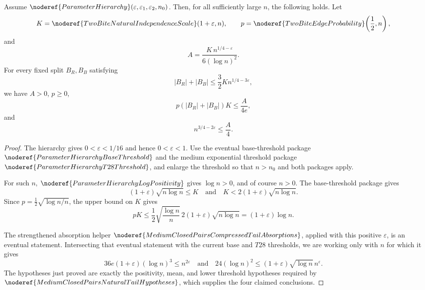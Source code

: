 \begin{lemma}
Assume \(\noderef{ParameterHierarchy}(\varepsilon,\varepsilon_1,\varepsilon_2,n_0)\).
Then, for all sufficiently large \(n\), the following holds.  Let
\[
K=\noderef{TwoBiteNaturalIndependenceScale}(1+\varepsilon,n),\qquad
p=\noderef{TwoBiteEdgeProbability}\!\left(\frac12,n\right),
\]
and
\[
A=\frac{K\,n^{1/4-\varepsilon}}{6(\log n)^2}.
\]
For every fixed split \(B_R,B_B\) satisfying
\[
|B_R|+|B_B|
\le \frac32 K n^{1/4-3\varepsilon},
\]
we have \(A>0\), \(p\ge0\),
\[
p(|B_R|+|B_B|)K\le\frac{A}{4e},
\]
and
\[
n^{3/4-2\varepsilon}\le \frac A4.
\]
\end{lemma}
\begin{proof}
The hierarchy gives \(0<\varepsilon<1/16\) and hence \(0<\varepsilon<1\).
Use the eventual base-threshold package
\(\noderef{ParameterHierarchyBaseThreshold}\) and the medium exponential
threshold package \(\noderef{ParameterHierarchyT28Threshold}\), and enlarge
the threshold so that \(n>n_0\) and both packages apply.

For such \(n\), \(\noderef{ParameterHierarchyLogPositivity}\) gives
\(\log n>0\), and of course \(n>0\).  The base-threshold package gives
\[
(1+\varepsilon)\sqrt{n\log n}\le K
\quad\text{and}\quad
K<2(1+\varepsilon)\sqrt{n\log n}.
\]
Since \(p=\frac12\sqrt{\log n/n}\), the upper bound on \(K\) gives
\[
pK\le
\frac12\sqrt{\frac{\log n}{n}}\,
2(1+\varepsilon)\sqrt{n\log n}
=(1+\varepsilon)\log n.
\]

The strengthened absorption helper
\(\noderef{MediumClosedPairsCompressedTailAbsorptions}\), applied with this
positive \(\varepsilon\), is an eventual statement.  Intersecting that
eventual statement with the current base and \(T28\) thresholds, we are
working only with \(n\) for which it gives
\[
36e(1+\varepsilon)(\log n)^3\le n^{2\varepsilon}
\quad\text{and}\quad
24(\log n)^2\le(1+\varepsilon)\sqrt{\log n}\,n^\varepsilon.
\]
The hypotheses just proved are exactly the positivity, mean, and lower
threshold hypotheses required by
\(\noderef{MediumClosedPairsNaturalTailHypotheses}\), which supplies the four
claimed conclusions.
\end{proof}
